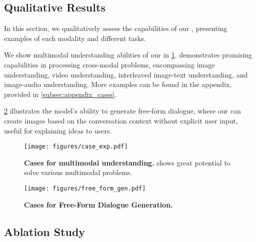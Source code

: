 \subsection{Qualitative Results}\label{subsec:exp_qualitative_results}

In this section, we qualitatively assess the capabilities of our \method, presenting examples of each modality and different tasks.

We show multimodal understanding abilities of our \method in \cref{fig-exp_case_all}. \method demonstrates promising capabilities in processing cross-modal problems, encompassing image understanding, video understanding, interleaved image-text understanding, and image-audio understanding. More examples can be found in the appendix, provided in \cref{subsec:appendix_cases}.

\cref{fig-IT-Freeform-Result} illustrates the model's ability to generate free-form dialogue, where our \method can create images based on the conversation context without explicit user input, useful for explaining ideas to users.




\begin{figure}[t]
    \centering
    \texttt{[image: figures/case\_exp.pdf]}
    \caption{
    \textbf{Cases for multimodal understanding.}
    \method shows great potential to solve various multimodal problems.
    }
    \label{fig-exp_case_all}
\end{figure}




\begin{figure}[t]
    \centering
    \texttt{[image: figures/free\_form\_gen.pdf]}
    \caption{
    \textbf{Cases for Free-Form Dialogue Generation.}
    }
    \label{fig-IT-Freeform-Result}
\end{figure}


\subsection{Ablation Study}\label{subsec:exp_ablation}

